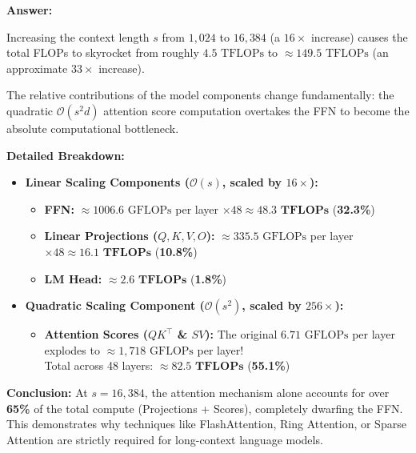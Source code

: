\begin{answerbox}
    \textbf{Answer:}

    Increasing the context length $s$ from $1,024$ to $16,384$ (a $16\times$ increase) causes the total FLOPs to skyrocket from roughly $4.5 \text{ TFLOPs}$ to \textbf{$\approx 149.5 \text{ TFLOPs}$} (an approximate $33\times$ increase).

    The relative contributions of the model components change fundamentally: the quadratic $\mathcal{O}(s^2d)$ attention score computation overtakes the FFN to become the absolute computational bottleneck.

    \vspace{0.5em}
    \textbf{Detailed Breakdown:}
    \begin{itemize}[itemsep=0.5em, parsep=0pt, topsep=0.5em]
        \item \textbf{Linear Scaling Components ($\mathcal{O}(s)$, scaled by $16\times$):}
              \begin{itemize}[itemsep=0.2em, parsep=0pt, topsep=0.2em]
                  \item \textbf{FFN:} $\approx 1006.6 \text{ GFLOPs}$ per layer $\times 48 \approx \mathbf{48.3 \text{ TFLOPs}}$ (\textbf{32.3\%})
                  \item \textbf{Linear Projections ($Q,K,V,O$):} $\approx 335.5 \text{ GFLOPs}$ per layer $\times 48 \approx \mathbf{16.1 \text{ TFLOPs}}$ (\textbf{10.8\%})
                  \item \textbf{LM Head:} $\approx \mathbf{2.6 \text{ TFLOPs}}$ (\textbf{1.8\%})
              \end{itemize}

        \item \textbf{Quadratic Scaling Component ($\mathcal{O}(s^2)$, scaled by $256\times$):}
              \begin{itemize}[itemsep=0.2em, parsep=0pt, topsep=0.2em]
                  \item \textbf{Attention Scores ($QK^\top$ \& $SV$):} The original $6.71 \text{ GFLOPs}$ per layer explodes to $\approx 1,718 \text{ GFLOPs}$ per layer! \\
                        Total across 48 layers: $\approx \mathbf{82.5 \text{ TFLOPs}}$ (\textbf{55.1\%})
              \end{itemize}
    \end{itemize}

    \vspace{0.5em}
    \textbf{Conclusion:}
    At $s=16,384$, the attention mechanism alone accounts for over \textbf{65\%} of the total compute (Projections + Scores), completely dwarfing the FFN. This demonstrates why techniques like FlashAttention, Ring Attention, or Sparse Attention are strictly required for long-context language models.

    \vspace{0.5em}
    \rule{0pt}{1.5em}
\end{answerbox}
